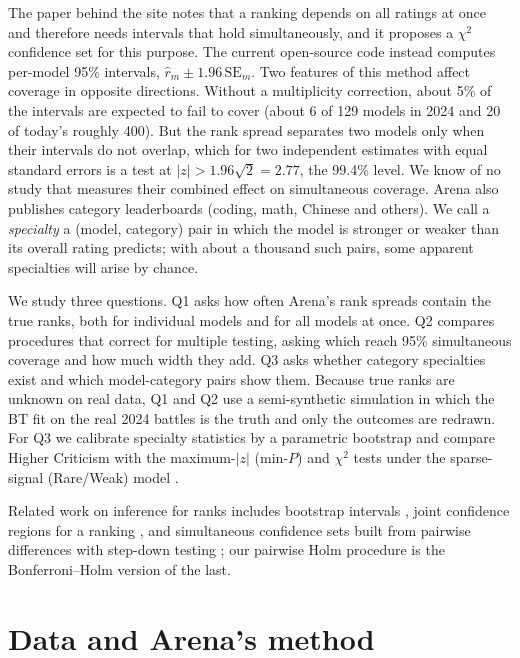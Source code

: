 \documentclass[12pt]{article}
\newcommand{\SE}{\mathrm{SE}}
\begin{document}
The paper behind the site \citep{chiang2024arena} notes that a ranking depends on all ratings at once and therefore needs intervals that hold simultaneously, and it proposes a $\chi^2$ confidence set for this purpose. The current open-source code \citep{lmarena2025arenarank} instead computes per-model 95\% intervals, $\hat r_m \pm 1.96\,\SE_m$. Two features of this method affect coverage in opposite directions. Without a multiplicity correction, about 5\% of the intervals are expected to fail to cover (about 6 of 129 models in 2024 and 20 of today's roughly 400). But the rank spread separates two models only when their intervals do not overlap, which for two independent estimates with equal standard errors is a test at $|z| > 1.96\sqrt2 = 2.77$, the 99.4\% level. We know of no study that measures their combined effect on simultaneous coverage. Arena also publishes category leaderboards (coding, math, Chinese and others). We call a \emph{specialty} a (model, category) pair in which the model is stronger or weaker than its overall rating predicts; with about a thousand such pairs, some apparent specialties will arise by chance.

We study three questions. Q1 asks how often Arena's rank spreads contain the true ranks, both for individual models and for all models at once. Q2 compares procedures that correct for multiple testing, asking which reach 95\% simultaneous coverage and how much width they add. Q3 asks whether category specialties exist and which model-category pairs show them. Because true ranks are unknown on real data, Q1 and Q2 use a semi-synthetic simulation in which the BT fit on the real 2024 battles is the truth and only the outcomes are redrawn. For Q3 we calibrate specialty statistics by a parametric bootstrap and compare Higher Criticism \citep{donoho2004higher} with the maximum-$|z|$ (min-$P$) and $\chi^2$ tests under the sparse-signal (Rare/Weak) model \citep{donoho2015higher}.

Related work on inference for ranks includes bootstrap intervals \citep{hall2009using}, joint confidence regions for a ranking \citep{klein2020joint}, and simultaneous confidence sets built from pairwise differences with step-down testing \citep{mogstad2024inference}; our pairwise Holm procedure is the Bonferroni--Holm version of the last.

\section{Data and Arena's method}\label{sec:data}
\end{document}
